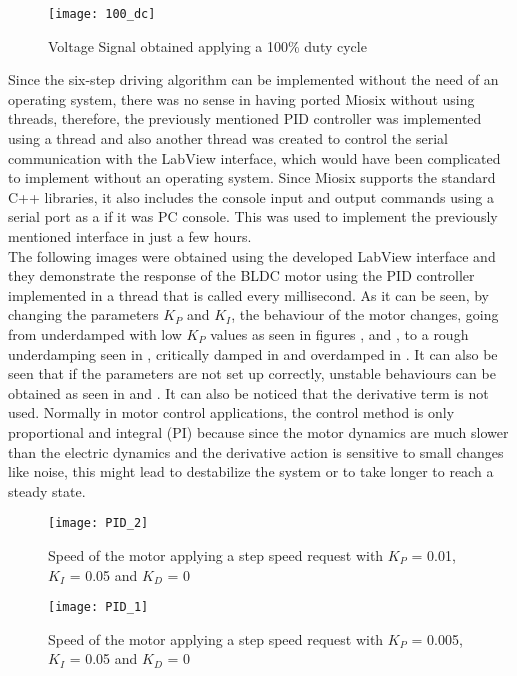 \begin{figure} [H]
\centering\texttt{[image: 100\_dc]}
\caption{Voltage Signal obtained applying a 100\% duty cycle}
\label{fig:dutycycle_100}
\end{figure}

Since the six-step driving algorithm can be implemented without the need of an operating system, there was no sense in having ported Miosix without using threads, therefore, the previously mentioned PID controller was implemented using a thread and also another thread was created to control the serial communication with the LabView interface, which would have been complicated to implement without an operating system. Since Miosix supports the standard C++ libraries, it also includes the console input and output commands using a serial port as a if it was PC console. This was used to implement the previously mentioned interface in just a few hours.\\

The following images were obtained using the developed LabView interface and they demonstrate the response of the BLDC motor using the PID controller implemented in a thread that is called every millisecond. As it can be seen, by changing the parameters $K_P$ and $K_I$, the behaviour of the motor changes, going from underdamped with low $K_P$ values as seen in figures ,  and , to a rough underdamping seen in , critically damped in  and overdamped in . It can also be seen that if the parameters are not set up correctly, unstable behaviours can be obtained as seen in  and . It can also be noticed that the derivative term is not used. Normally in motor control applications, the control method is only proportional and integral (PI) because since the motor dynamics are much slower than the electric dynamics and the derivative action is sensitive to small changes like noise, this might lead to destabilize the system or to take longer to reach a steady state.

\begin{figure} [H]
\centering\texttt{[image: PID\_2]}
\caption{Speed of the motor applying a step speed request with $K_P$ = 0.01, $K_I$ = 0.05 and $K_D$ = 0}
\label{fig:PID_2}
\end{figure}

\begin{figure} [H]
\centering\texttt{[image: PID\_1]}
\caption{Speed of the motor applying a step speed request with $K_P$ = 0.005, $K_I$ = 0.05 and $K_D$ = 0}
\label{fig:PID_1}
\end{figure}

